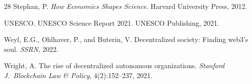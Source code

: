 \documentclass[11pt,a4paper]{article}
\begin{document}
\begin{thebibliography}{28}
Stephan, P.
\newblock \emph{How Economics Shapes Science}.
\newblock Harvard University Press, 2012.

UNESCO.
\newblock UNESCO Science Report 2021.
\newblock UNESCO Publishing, 2021.

Weyl, E.G., Ohlhaver, P., and Buterin, V.
\newblock Decentralized society: Finding web3's soul.
\newblock \emph{SSRN}, 2022.

Wright, A.
\newblock The rise of decentralized autonomous organizations.
\newblock \emph{Stanford J.\ Blockchain Law \& Policy}, 4(2):152--237, 2021.

\end{thebibliography}
\end{document}
